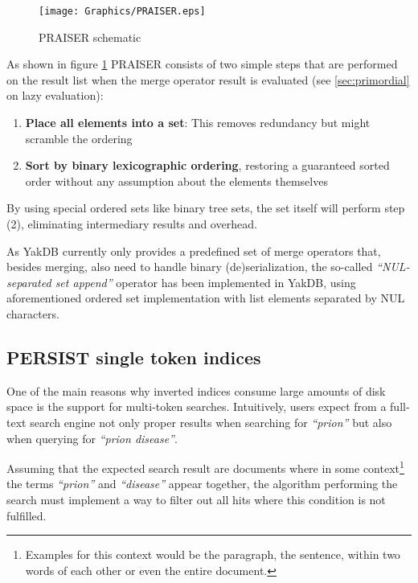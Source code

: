 \documentclass[a4paper, 12pt, twoside, reqn]{report}
\numberwithin{figure}{chapter}
\newtheorem[L]{boxedDefinition}{Definition}
\newtheorem[L]{boxedExample}{Example}
\newcommand{\itquote}[1]{\textit{{``}#1{''}}}
\begin{document}
\begin{figure}[!htb]
  \centering
  \texttt{[image: Graphics/PRAISER.eps]}
  \caption{PRAISER schematic}
  \label{fig:praiser}
\end{figure}

As shown in figure \ref{fig:praiser} PRAISER consists of two simple steps that are performed on the result list when the merge operator result is evaluated (see \ref{sec:primordial} on lazy evaluation):
\begin{enumerate}[label={(\arabic*)}]
 \item \textbf{Place all elements into a set}: This removes redundancy but might scramble the ordering
 \item \textbf{Sort by binary lexicographic ordering}, restoring a guaranteed sorted order without any assumption about the elements themselves
\end{enumerate}

By using special ordered sets like binary tree sets, the set itself will perform step (2), eliminating intermediary results and overhead.

As YakDB currently only provides a predefined set of merge operators that, besides merging, also need to handle binary (de)serialization, the so-called \itquote{NUL-separated set append} operator has been implemented in YakDB, using aforementioned ordered set implementation with list elements separated by NUL characters.



\subsection{PERSIST single token indices}\label{sec:persist}

One of the main reasons why inverted indices consume large amounts of disk space is the support for multi-token searches. Intuitively, users expect from a full-text search engine not only proper results when searching for \itquote{prion} but also when querying for \itquote{prion disease}.

Assuming that the expected search result are documents where in some context\footnote{Examples for this context would be the paragraph, the sentence, within two words of each other or even the entire document.} the terms \itquote{prion} and \itquote{disease} appear together, the algorithm performing the search must implement a way to filter out all hits where this condition is not fulfilled.
\end{document}
